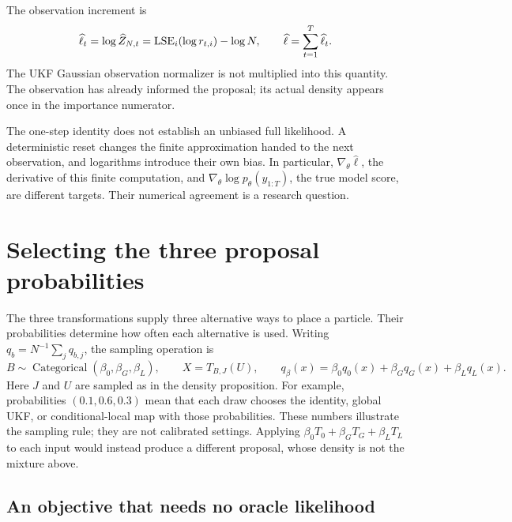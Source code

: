 The observation increment is
\begin{equation}
\label{eq:bf-covariance-proposal-log-increment}
 \widehat\ell_t
 =\log\widehat Z_{N,t}
 =\operatorname{LSE}_i(\log r_{t,i})-\log N,\qquad
 \widehat\ell=\sum_{t=1}^T\widehat\ell_t.
\end{equation}
The UKF Gaussian observation normalizer is not multiplied into this
quantity. The observation has already informed the proposal; its actual
density appears once in the importance numerator.

The one-step identity does not establish an unbiased full likelihood.
A deterministic reset changes the finite approximation handed to the
next observation, and logarithms introduce their own bias. In particular,
\(\nabla_\theta\widehat\ell\), the derivative of this finite computation,
and \(\nabla_\theta\log p_\theta(y_{1:T})\), the true model score, are
different targets. Their numerical agreement is a research question.


\section{Selecting the three proposal probabilities}
\label{sec:bf-covariance-proposal-beta-selection}

The three transformations supply three alternative ways to place a particle.
Their probabilities determine how often each alternative is used. Writing
\(q_b=N^{-1}\sum_jq_{b,j}\), the sampling operation is
\begin{equation}
\label{eq:bf-covariance-proposal-beta-sampler}
 B\sim\operatorname{Categorical}(\beta_0,\beta_G,\beta_L),\qquad
 X=T_{B,J}(U),\qquad
 q_\beta(x)=\beta_0q_0(x)+\beta_Gq_G(x)+\beta_Lq_L(x).
\end{equation}
Here \(J\) and \(U\) are sampled as in the density proposition. For example,
probabilities \((0.1,0.6,0.3)\) mean that each draw chooses the identity,
global UKF, or conditional-local map with those probabilities. These numbers
illustrate the sampling rule; they are not calibrated settings. Applying
\(\beta_0T_0+\beta_GT_G+\beta_LT_L\) to each input would instead produce
a different proposal, whose density is not the mixture above.

\subsection{An objective that needs no oracle likelihood}

